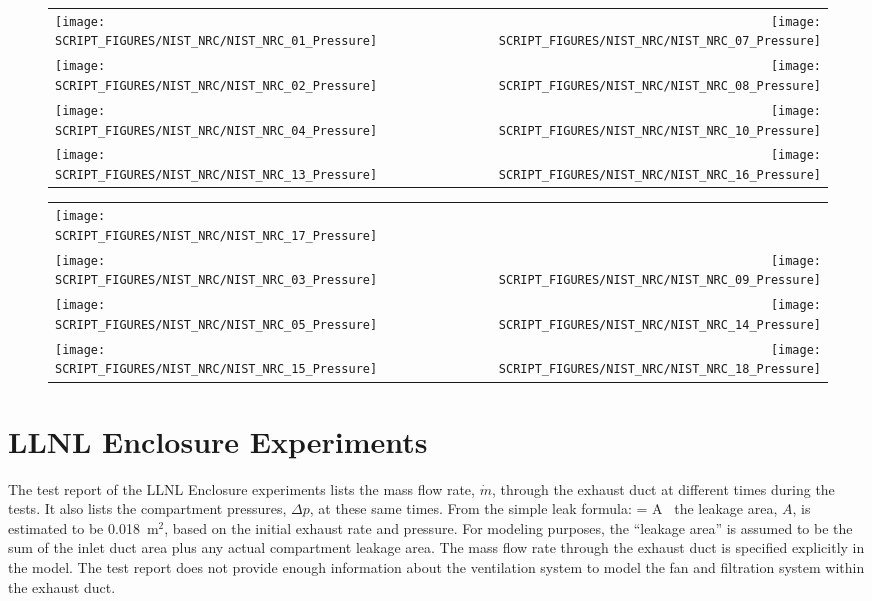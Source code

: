 \begin{figure}[p]
\begin{tabular*}{\textwidth}{l@{\extracolsep{\fill}}r}
\texttt{[image: SCRIPT\_FIGURES/NIST\_NRC/NIST\_NRC\_01\_Pressure]} &
\texttt{[image: SCRIPT\_FIGURES/NIST\_NRC/NIST\_NRC\_07\_Pressure]} \\
\texttt{[image: SCRIPT\_FIGURES/NIST\_NRC/NIST\_NRC\_02\_Pressure]} &
\texttt{[image: SCRIPT\_FIGURES/NIST\_NRC/NIST\_NRC\_08\_Pressure]} \\
\texttt{[image: SCRIPT\_FIGURES/NIST\_NRC/NIST\_NRC\_04\_Pressure]} &
\texttt{[image: SCRIPT\_FIGURES/NIST\_NRC/NIST\_NRC\_10\_Pressure]} \\
\texttt{[image: SCRIPT\_FIGURES/NIST\_NRC/NIST\_NRC\_13\_Pressure]} &
\texttt{[image: SCRIPT\_FIGURES/NIST\_NRC/NIST\_NRC\_16\_Pressure]}
\end{tabular*}
\label{NIST_NRC_Pressure_Closed}
\end{figure}

\begin{figure}[p]
\begin{tabular*}{\textwidth}{l@{\extracolsep{\fill}}r}
\texttt{[image: SCRIPT\_FIGURES/NIST\_NRC/NIST\_NRC\_17\_Pressure]} &
   \\
\texttt{[image: SCRIPT\_FIGURES/NIST\_NRC/NIST\_NRC\_03\_Pressure]} &
\texttt{[image: SCRIPT\_FIGURES/NIST\_NRC/NIST\_NRC\_09\_Pressure]} \\
\texttt{[image: SCRIPT\_FIGURES/NIST\_NRC/NIST\_NRC\_05\_Pressure]} &
\texttt{[image: SCRIPT\_FIGURES/NIST\_NRC/NIST\_NRC\_14\_Pressure]} \\
\texttt{[image: SCRIPT\_FIGURES/NIST\_NRC/NIST\_NRC\_15\_Pressure]} &
\texttt{[image: SCRIPT\_FIGURES/NIST\_NRC/NIST\_NRC\_18\_Pressure]}
\end{tabular*}
\label{NIST_NRC_Pressure_Open}
\end{figure}

\clearpage

\section{LLNL Enclosure Experiments}

The test report of the LLNL Enclosure experiments lists the mass flow rate, $\dot{m}$, through the exhaust duct at different times during the tests. It also lists the compartment pressures, $\Delta p$, at these same times. From the simple leak formula:
\be 
    = A \,  
\ee
the leakage area, $A$, is estimated to be 0.018~m$^2$, based on the initial exhaust rate and pressure. For modeling purposes, the ``leakage area'' is assumed to be the sum of the inlet duct area plus any actual compartment leakage area. The mass flow rate through the exhaust duct is specified explicitly in the model. The test report does not provide enough information about the ventilation system to model the fan and filtration system within the exhaust duct.

